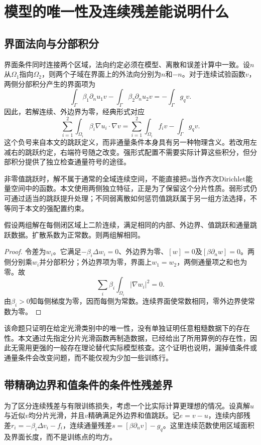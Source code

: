 \section{模型的唯一性及连续残差能说明什么}
\subsection{界面法向与分部积分}
界面条件同时连接两个区域，法向约定必须在模型、离散和误差计算中一致。设$n$从$\Omega_1$指向$\Omega_2$，则两个子域在界面上的外法向分别为$n$和$-n$。对于连续试验函数$v$，两侧分部积分产生的界面项为
\[
\int_\Gamma \beta_1\partial_n u_1v-\int_\Gamma\beta_2\partial_n u_2v
=-\int_\Gamma g_qv.
\]
因此，若解连续、外边界为零，经典形式对应
\begin{equation}\label{eq:weak_interface}
\sum_{i=1}^2\int_{\Omega_i}\beta_i\nabla u_i\cdot\nabla v
=\sum_{i=1}^2\int_{\Omega_i}f_iv-\int_\Gamma g_qv.
\end{equation}
这个负号来自本文的跳跃定义，而非通量条件本身具有另一种物理含义。若改用左减右的跳跃约定，右端符号随之改变。强形式配置不需要实际计算这些积分，但分部积分提供了独立检查通量符号的途径。

非零值跳跃时，解不属于通常的全域连续空间，不能直接把$u$当作齐次Dirichlet能量空间中的函数。本文使用两侧独立特征，正是为了保留这个分片性质。弱形式仍可通过适当的跳跃提升处理；不同弱离散如何惩罚值跳跃属于另一组方法选择，不等同于本文的强配置约束。

\begin{proposition}[直线界面经典解的唯一性]\label{prop:unique}
假设两组解在每侧闭区域上二阶连续，满足相同的内部、外边界、值跳跃和通量跳跃数据。扩散系数为正常数。则两组解相同。
\end{proposition}
\begin{proof}
令差为$w_i$。它满足$-\beta_i\Delta w_i=0$、外边界为零、$[w]=0$及$[\beta\partial_nw]=0$。两侧分别乘$w_i$并分部积分；外边界项为零，界面上$w_1=w_2$，两侧通量项之和也为零。故
\[
\sum_i\beta_i\int_{\Omega_i}|\nabla w_i|^2=0.
\]
由$\beta_i>0$知每侧梯度为零，因而每侧为常数。连续界面使常数相同，零外边界使常数为零。
\end{proof}
该命题只证明在给定光滑类别中的唯一性，没有单独证明任意粗糙数据下的存在性。本文通过先指定分片光滑函数再制造数据，已经给出了所用算例的存在性，因此无需用更强的一般存在理论替代实际模型核查。这个证明也说明，漏掉值条件或通量条件会改变问题，而不能仅视为少加一些训练行。

\subsection{带精确边界和值条件的条件性残差界}
为了区分连续残差与有限训练损失，考虑一个比实际计算更理想的情况。设真解$u$与近似$v$均分片光滑，并且$v$精确满足外边界和值跳跃。记$e=v-u$，连续内部残差$r_i=-\beta_i\Delta v_i-f_i$，连续通量残差$s=[\beta\partial_nv]-g_q$。这里连续范数使用区域面积及界面长度，而不是训练点的均方。

